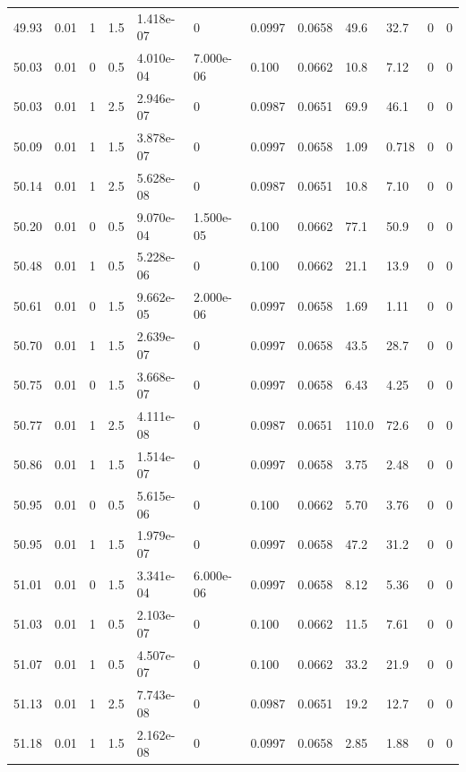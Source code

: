 \documentclass[preview]{standalone}
\begin{document}
{{{{{{{{{{{\begin{tabular}{L{1.2cm}C{1.2cm} C{0.3cm}C{0.5cm} C{1.4cm}C{1.4cm} C{1.4cm}C{1.4cm} C{1.6cm}C{1.6cm} C{1.6cm}C{1.6cm}}
  49.93  &  0.01  & 1     & 1.5 &  1.418e-07  & 0  &  0.0997&   0.0658& 49.6 & 32.7   &  0 & 0  \\ 
  50.03  &  0.01  & 0     & 0.5 &  4.010e-04  & 7.000e-06  &  0.100&   0.0662& 10.8 & 7.12   &  0 & 0  \\ 
  50.03  &  0.01  & 1     & 2.5 &  2.946e-07  & 0  &  0.0987&   0.0651& 69.9 & 46.1   &  0 & 0  \\ 
  50.09  &  0.01  & 1     & 1.5 &  3.878e-07  & 0  &  0.0997&   0.0658& 1.09 & 0.718   &  0 & 0  \\ 
  50.14  &  0.01  & 1     & 2.5 &  5.628e-08  & 0  &  0.0987&   0.0651& 10.8 & 7.10   &  0 & 0  \\ 
  50.20  &  0.01  & 0     & 0.5 &  9.070e-04  & 1.500e-05  &  0.100&   0.0662& 77.1 & 50.9   &  0 & 0  \\ 
  50.48  &  0.01  & 1     & 0.5 &  5.228e-06  & 0  &  0.100&   0.0662& 21.1 & 13.9   &  0 & 0  \\ 
  50.61  &  0.01  & 0     & 1.5 &  9.662e-05  & 2.000e-06  &  0.0997&   0.0658& 1.69 & 1.11   &  0 & 0  \\ 
  50.70  &  0.01  & 1     & 1.5 &  2.639e-07  & 0  &  0.0997&   0.0658& 43.5 & 28.7   &  0 & 0  \\ 
  50.75  &  0.01  & 0     & 1.5 &  3.668e-07  & 0  &  0.0997&   0.0658& 6.43 & 4.25   &  0 & 0  \\ 
  50.77  &  0.01  & 1     & 2.5 &  4.111e-08  & 0  &  0.0987&   0.0651& 110.0 & 72.6   &  0 & 0  \\ 
  50.86  &  0.01  & 1     & 1.5 &  1.514e-07  & 0  &  0.0997&   0.0658& 3.75 & 2.48   &  0 & 0  \\ 
  50.95  &  0.01  & 0     & 0.5 &  5.615e-06  & 0  &  0.100&   0.0662& 5.70 & 3.76   &  0 & 0  \\ 
  50.95  &  0.01  & 1     & 1.5 &  1.979e-07  & 0  &  0.0997&   0.0658& 47.2 & 31.2   &  0 & 0  \\ 
  51.01  &  0.01  & 0     & 1.5 &  3.341e-04  & 6.000e-06  &  0.0997&   0.0658& 8.12 & 5.36   &  0 & 0  \\ 
  51.03  &  0.01  & 1     & 0.5 &  2.103e-07  & 0  &  0.100&   0.0662& 11.5 & 7.61   &  0 & 0  \\ 
  51.07  &  0.01  & 1     & 0.5 &  4.507e-07  & 0  &  0.100&   0.0662& 33.2 & 21.9   &  0 & 0  \\ 
  51.13  &  0.01  & 1     & 2.5 &  7.743e-08  & 0  &  0.0987&   0.0651& 19.2 & 12.7   &  0 & 0  \\ 
  51.18  &  0.01  & 1     & 1.5 &  2.162e-08  & 0  &  0.0997&   0.0658& 2.85 & 1.88   &  0 & 0  \\ 

\end{tabular}}}}}}}}}}}}
\end{document}

